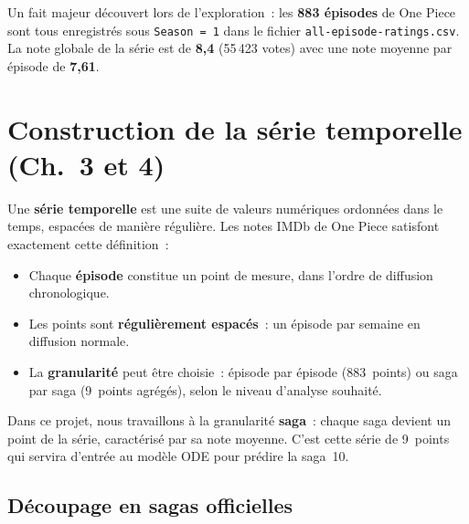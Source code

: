 \documentclass[a4paper,12pt,french]{article}
\newcommand{\code}[1]{\texttt{#1}}
\begin{document}
Un fait majeur découvert lors de l'exploration~: les \textbf{883 épisodes} de One
Piece sont tous enregistrés sous \code{Season = 1} dans le fichier
\code{all-episode-ratings.csv}. La note globale de la série est de \textbf{8{,}4}
(55\,423 votes) avec une note moyenne par épisode de \textbf{7{,}61}.





\newpage
\section{Construction de la série temporelle (Ch.~3 et 4)}

\begin{tcolorbox}[justif, title={Pourquoi les notes IMDb forment-elles une série temporelle~?}]
Une \textbf{série temporelle} est une suite de valeurs numériques ordonnées dans
le temps, espacées de manière régulière. Les notes IMDb de One Piece satisfont
exactement cette définition~:

\begin{itemize}
  \item Chaque \textbf{épisode} constitue un point de mesure, dans l'ordre de
        diffusion chronologique.
  \item Les points sont \textbf{régulièrement espacés}~: un épisode par semaine
        en diffusion normale.
  \item La \textbf{granularité} peut être choisie~: épisode par épisode (883~points)
        ou saga par saga (9~points agrégés), selon le niveau d'analyse souhaité.
\end{itemize}

Dans ce projet, nous travaillons à la granularité \textbf{saga}~: chaque saga
devient un point de la série, caractérisé par sa note moyenne. C'est cette série
de 9~points qui servira d'entrée au modèle ODE pour prédire la saga~10.
\end{tcolorbox}

\subsection{Découpage en sagas officielles}
\end{document}
